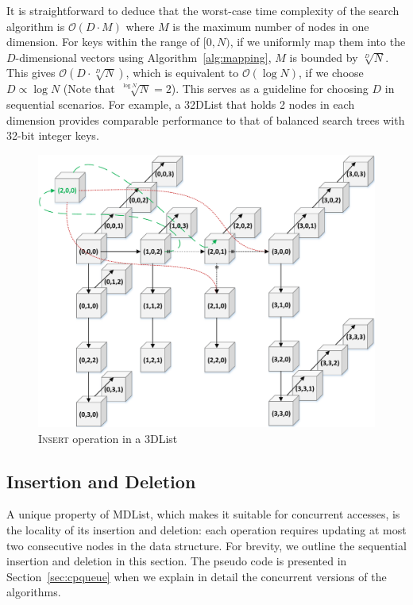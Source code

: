 \documentclass[10pt,journal,letter,compsoc]{IEEEtran}
\begin{document}
It is straightforward to deduce that the worst-case time complexity of the search algorithm is $\mathcal{O}(D \cdot M)$ where $M$ is the maximum number of nodes in one dimension.
For keys within the range of $[0,N)$, if we uniformly map them into the $D$-dimensional vectors using Algorithm~\ref{alg:mapping}, $M$ is bounded by $\sqrt[D]{N}$.
This gives $\mathcal{O}(D \cdot \sqrt[D]{N})$, which is equivalent to $\mathcal{O}(\log{N})$, if we choose $D \propto \log{N}$ (Note that $\sqrt[\log{N}]{N}=2$).
This serves as a guideline for choosing $D$ in sequential scenarios. 
For example, a 32DList that holds 2 nodes in each dimension provides comparable performance to that of balanced search trees with 32-bit integer keys.

\begin{figure}[t]
    \centering
    \includegraphics[width=0.95\columnwidth]{./graph/mdlist-3d-ins}
    \caption{\textsc{Insert} operation in a 3DList}
    \label{fig:mdlist3dins}
    \vspace{-0.22in}
\end{figure}

\subsection{Insertion and Deletion}
\label{sec:mdlistinsdel}
A unique property of MDList, which makes it suitable for concurrent accesses, is the locality of its insertion and deletion: each operation requires updating at most two consecutive nodes in the data structure. 
For brevity, we outline the sequential insertion and deletion in this section. 
The pseudo code is presented in Section~\ref{sec:cpqueue} when we explain in detail the concurrent versions of the algorithms.
\end{document}
